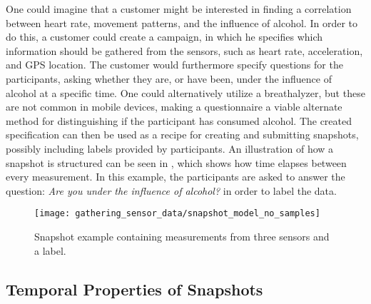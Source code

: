 One could imagine that a customer might be interested in finding a correlation between heart rate, movement patterns, and the influence of alcohol. In order to do this, a customer could create a campaign, in which he specifies which information should be gathered from the sensors, such as heart rate, acceleration, and GPS location. The customer would furthermore specify questions for the participants, asking whether they are, or have been, under the influence of alcohol at a specific time. One could alternatively utilize a breathalyzer, but these are not common in mobile devices, making a questionnaire a viable alternate method for distinguishing if the participant has consumed alcohol. The created specification can then be used as a recipe for creating and submitting snapshots, possibly including labels provided by participants. An illustration of how a snapshot is structured can be seen in , which shows how time elapses between every measurement. In this example, the participants are asked to answer the question: \emph{Are you under the influence of alcohol?} in order to label the data.
\\
\begin{figure}[!htbp]
    \centering
    \texttt{[image: gathering\_sensor\_data/snapshot\_model\_no\_samples]}
    \caption{Snapshot example containing measurements from three sensors and a label.}
    \label{fig:snapshot_model_no_samples}
\end{figure}
\FloatBarrier



\subsection{Temporal Properties of Snapshots}
\label{sec:temporal_properties_of_snapshots}

